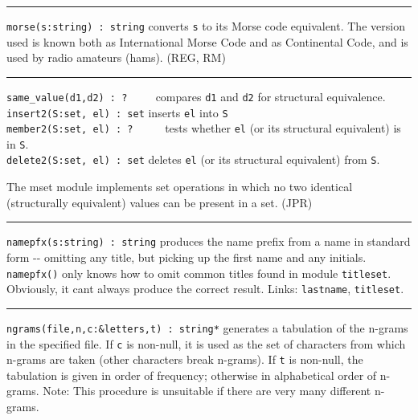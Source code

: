 \vspace{0.25cm}\hrule{}

\texttt{morse(s:string) : string} converts \texttt{s} to its
Morse code equivalent. The version used is known both
as International Morse Code and as Continental Code, and is used by
radio amateurs (hams). (REG, RM)

\vspace{0.25cm}\hrule{}

\texttt{same\_value(d1,d2) : ? \ }\ \ \ compares \texttt{d1} and
\texttt{d2} for structural equivalence.\\
\texttt{insert2(S:set, el) : set} inserts \texttt{el} into \texttt{S}
\\
\texttt{member2(S:set, el) : ?} \ \ \ \ \ tests whether \texttt{el} (or
its structural equivalent) is in \texttt{S}.\\
\texttt{delete2(S:set, el) : set} deletes \texttt{el} (or its structural
equivalent) from \texttt{S}.

The mset module implements set operations in which no two identical
(structurally equivalent) values can be present in a set. (JPR)

\vspace{0.25cm}\hrule{}

\texttt{namepfx(s:string) : string} produces the {\textquotedbl}name
prefix{\textquotedbl} from a name in standard form -{}- omitting any
title, but picking up the first name and any initials.
\texttt{namepfx()} only knows how to omit common titles found in module
\texttt{titleset}. Obviously, it can{\textquotesingle}t always produce
the {\textquotedbl}correct{\textquotedbl} result. Links:
\texttt{lastname}, \texttt{titleset}. 

\vspace{0.25cm}\hrule{}

\texttt{ngrams(file,n,c:\&letters,t) : string*} generates a tabulation
of the n-grams in the specified file. If \texttt{c} is non-null, it is
used as the set of characters from which n-grams are
taken (other characters break n-grams). If \texttt{t} is non-null, the
tabulation is given in order of frequency; otherwise in alphabetical
order of n-grams. Note: This procedure is unsuitable if there are very
many different n-grams. 

